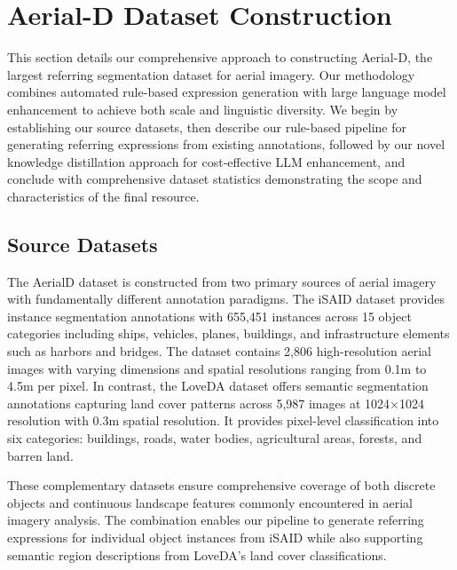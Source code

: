 
\section{Aerial-D Dataset Construction}
\label{sec:approach}

This section details our comprehensive approach to constructing Aerial-D, the largest referring segmentation dataset for aerial imagery. Our methodology combines automated rule-based expression generation with large language model enhancement to achieve both scale and linguistic diversity. We begin by establishing our source datasets, then describe our rule-based pipeline for generating referring expressions from existing annotations, followed by our novel knowledge distillation approach for cost-effective LLM enhancement, and conclude with comprehensive dataset statistics demonstrating the scope and characteristics of the final resource.

\subsection{Source Datasets}

The AerialD dataset is constructed from two primary sources of aerial imagery with fundamentally different annotation paradigms. The iSAID dataset provides instance segmentation annotations with 655,451 instances across 15 object categories including ships, vehicles, planes, buildings, and infrastructure elements such as harbors and bridges. The dataset contains 2,806 high-resolution aerial images with varying dimensions and spatial resolutions ranging from 0.1m to 4.5m per pixel. In contrast, the LoveDA dataset offers semantic segmentation annotations capturing land cover patterns across 5,987 images at 1024×1024 resolution with 0.3m spatial resolution. It provides pixel-level classification into six categories: buildings, roads, water bodies, agricultural areas, forests, and barren land.

These complementary datasets ensure comprehensive coverage of both discrete objects and continuous landscape features commonly encountered in aerial imagery analysis. The combination enables our pipeline to generate referring expressions for individual object instances from iSAID while also supporting semantic region descriptions from LoveDA's land cover classifications.

